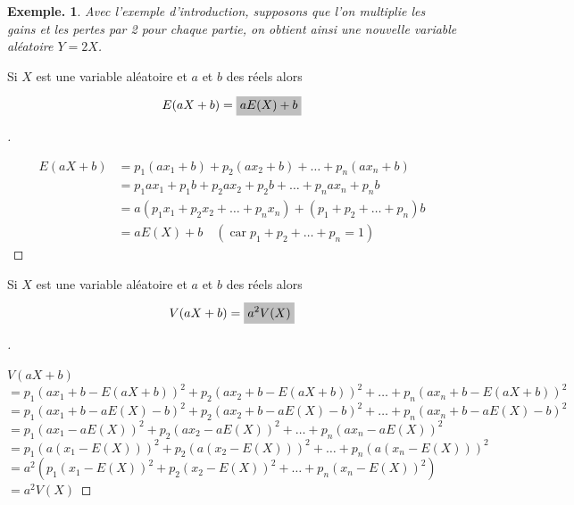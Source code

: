 \documentclass[12pt]{article}
\theoremstyle{break}
\newtheorem*{example}{Exemple.}
\newenvironment{demo}[1][\proofname]{%
  \begin{proof}[#1]$ $\newline
  }{%
  \end{proof}
}
\begin{document}
\begin{example}
  Avec l'exemple d'introduction, supposons que l'on multiplie les gains et les pertes par 2 pour chaque partie, on obtient ainsi une nouvelle variable aléatoire $Y=2 X$.
\end{example}

\begin{proposition}{}{}
  Si $X$ est une variable aléatoire et $a$ et $b$ des réels alors

  $$
  E(a X+b)=\hideM{a E(X)+b}
  $$
\end{proposition}

\begin{demo}
  $$
  \begin{aligned}
    E(a X+b) & =p_{1}\left(a x_{1}+b\right)+p_{2}\left(a x_{2}+b\right)+\ldots+p_{n}\left(a x_{n}+b\right) \\
    & =p_{1} a x_{1}+p_{1} b+p_{2} a x_{2}+p_{2} b+\ldots+p_{n} a x_{n}+p_{n} b \\
    & =a\left(p_{1} x_{1}+p_{2} x_{2}+\ldots+p_{n} x_{n}\right)+\left(p_{1}+p_{2}+\ldots+p_{n}\right) b \\
    & =a E(X)+b \quad\left(\operatorname{car} p_{1}+p_{2}+\ldots+p_{n}=1\right)
  \end{aligned}
  $$
\end{demo}

\begin{proposition}{}{}
  Si $X$ est une variable aléatoire et $a$ et $b$ des réels alors

  $$
  V(a X+b)=\hideM{a^{2} V(X)}
  $$
\end{proposition}
\newpage
\begin{demo}
  $V(a X+b)$\\
  $=p_{1}\left(a x_{1}+b-E(a X+b)\right)^{2}+p_{2}\left(a x_{2}+b-E(a X+b)\right)^{2}+\ldots+p_{n}\left(a x_{n}+b-E(a X+b)\right)^{2}$\\
  $=p_{1}\left(a x_{1}+b-a E(X)-b\right)^{2}+p_{2}\left(a x_{2}+b-a E(X)-b\right)^{2}+\ldots+p_{n}\left(a x_{n}+b-a E(X)-b\right)^{2}$\\
  $=p_{1}\left(a x_{1}-a E(X)\right)^{2}+p_{2}\left(a x_{2}-a E(X)\right)^{2}+\ldots+p_{n}\left(a x_{n}-a E(X)\right)^{2}$\\
  $=p_{1}\left(a\left(x_{1}-E(X)\right)\right)^{2}+p_{2}\left(a\left(x_{2}-E(X)\right)\right)^{2}+\ldots+p_{n}\left(a\left(x_{n}-E(X)\right)\right)^{2}$\\
  $=a^{2}\left(p_{1}\left(x_{1}-E(X)\right)^{2}+p_{2}\left(x_{2}-E(X)\right)^{2}+\ldots+p_{n}\left(x_{n}-E(X)\right)^{2}\right)$\\
  $=a^{2} V(X)$
\end{demo}
\end{document}
